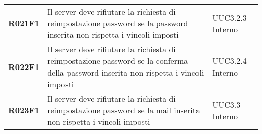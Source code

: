 \documentclass[../analisi-dei-requisiti.tex]{subfiles}
\begin{document}
\begin{longtable}[H]{>{\centering\bfseries}m{3cm} >{\centering}m{10cm} >{\centering\arraybackslash}m{3cm}}
  R021F1                               & Il server deve rifiutare la richiesta di reimpostazione password se la password inserita non rispetta i vincoli imposti                                                                                 & UUC3.2.3 Interno              \\
  R022F1                               & Il server deve rifiutare la richiesta di reimpostazione password se la conferma della password inserita non rispetta i vincoli imposti                                                                  & UUC3.2.4 Interno              \\
  R023F1                               & Il server deve rifiutare la richiesta di reimpostazione password se la mail inserita non rispetta i vincoli imposti                                                                                     & UUC3.3 Interno                \\


\end{longtable}
\end{document}
